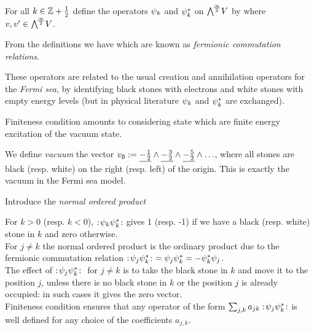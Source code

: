 \documentclass[10pt,handout]{beamer} %
\begin{document}
\begin{frame}

\begin{definition}

For all $k\in\mathbb Z+\frac12$ define the operators $\psi_k$ and $\psi_k^*$ on $\bigwedge^{\!\frac\infty2}\!V$ by 
where $v,v'\in\bigwedge^{\!\frac\infty2}\!V$.
\end{definition}\pause

From the definitions we have
which are known as \emph{fermionic commutation relations}. \pause

These operators are related to the usual creation and annihilation operators for the \emph{Fermi sea}, by identifying black stones with electrons and white stones with empty energy levels (but in physical literature $\psi_k$ and $\psi_k^*$ are exchanged). 

Finiteness condition amounts to considering state which are finite energy excitation of the vacuum state. \pause

We define \emph{vacuum} the vector $v_\emptyset:=\underline{-\frac12}\wedge\underline{-\frac32}\wedge\underline{-\frac52}\wedge\ldots$, where all stones are black (resp. white) on the right (resp. left) of the origin. This is exactly the vacuum in the Fermi sea model.

\end{frame}

\begin{frame}

\begin{definition}

Introduce the \emph{normal ordered product}

\end{definition}\pause

For $k>0$ (resp. $k<0$), $:\!{\psi_k\psi_k^*}\!:$ gives 1 (resp. -1) if we have a black (resp. white) stone in $k$ and zero otherwise.\\
For $j\neq k$ the normal ordered product is the ordinary product due to the fermionic commutation relation $\no{\p_j\p_k^*}\ =\p_j\p_k^*=-\p_k^*\p_j$.\\\pause
The effect of $:\!{\psi_j\psi_k^*}\!:\ $ for $j\neq k$ is to take the black stone in $k$ and move it to the position $j$, unless there is no black stone in $k$ or the position $j$ is already occupied: in such cases it gives the zero vector. \\\pause
Finiteness condition ensures that any operator of the form $\sum_{j,k}a_{jk}:\!{\psi_j\psi_k^*}\!:$ is well defined for any choice of the coefficients $a_{j,k}$.

\end{frame}
\end{document}
